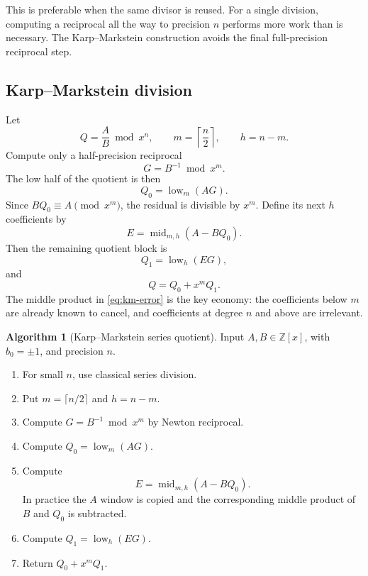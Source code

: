 \documentclass[11pt]{book}
\theoremstyle{definition}
\newtheorem{algorithm}[theorem]{Algorithm}
\newcommand{\ZZ}{\mathbb Z}
\begin{document}
This is preferable when the same divisor is reused.  For a single division,
computing a reciprocal all the way to precision $n$ performs more work than is
necessary.  The Karp--Markstein construction avoids the final full-precision
reciprocal step.

\subsection{Karp--Markstein division}\label{subsec:karp-markstein}

Let
\[
 Q=\frac AB\bmod x^n,
 \qquad
 m=\left\lceil\frac n2\right\rceil,
 \qquad
 h=n-m.
\]
Compute only a half-precision reciprocal
\[
 G=B^{-1}\bmod x^m.
\]
The low half of the quotient is then
\begin{equation}\label{eq:km-q0}
 Q_0=\operatorname{low}_m(AG).
\end{equation}
Since $BQ_0\equiv A\pmod{x^m}$, the residual is divisible by $x^m$.  Define
its next $h$ coefficients by
\begin{equation}\label{eq:km-error}
 E=\operatorname{mid}_{m,h}(A-BQ_0).
\end{equation}
Then the remaining quotient block is
\begin{equation}\label{eq:km-q1}
 Q_1=\operatorname{low}_h(EG),
\end{equation}
and
\[
 Q=Q_0+x^mQ_1.
\]
The middle product in \eqref{eq:km-error} is the key economy: the coefficients
below $m$ are already known to cancel, and coefficients at degree $n$ and
above are irrelevant.

\begin{algorithm}[Karp--Markstein series quotient]\label{alg:karp-markstein}
Input $A,B\in\ZZ[x]$, with $b_0=\pm1$, and precision $n$.
\begin{enumerate}
 \item For small $n$, use classical series division.
 \item Put $m=\lceil n/2\rceil$ and $h=n-m$.
 \item Compute $G=B^{-1}\bmod x^m$ by Newton reciprocal.
 \item Compute $Q_0=\operatorname{low}_m(AG)$.
 \item Compute
 \[
  E=\operatorname{mid}_{m,h}(A-BQ_0).
 \]
 In practice the $A$ window is copied and the corresponding middle product
 of $B$ and $Q_0$ is subtracted.
 \item Compute $Q_1=\operatorname{low}_h(EG)$.
 \item Return $Q_0+x^mQ_1$.
\end{enumerate}
\end{algorithm}
\end{document}

